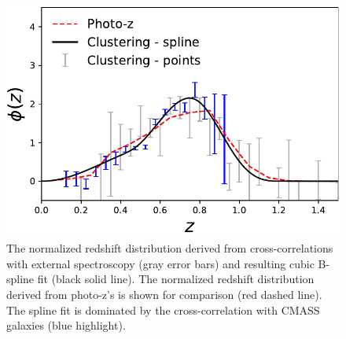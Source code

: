 \begin{figure}
\includegraphics[width=\linewidth]{figures/clustering_dndz.pdf}
\caption{The normalized redshift distribution derived from cross-correlations with external spectroscopy (gray error bars) and resulting cubic B-spline fit (black solid line). The normalized redshift distribution derived from photo-z's is shown for comparison (red dashed line). The spline fit is dominated by the cross-correlation with CMASS galaxies (blue highlight).}
\label{fig:clustering_dndz}
\end{figure}

